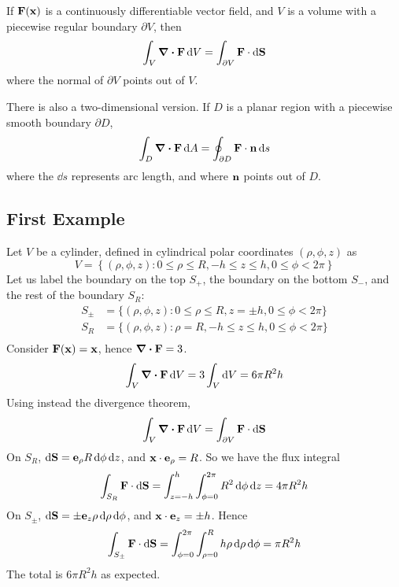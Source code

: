 \begin{proposition}
	If \(\vb F(\vb x)\) is a continuously differentiable vector field, and \(V\) is a volume with a piecewise regular boundary \(\partial V\), then
	\[ \int_V \div{\vb F} \dd{V} = \int_{\partial V} \vb F \cdot \dd{\vb S} \]
	where the normal of \(\partial V\) points out of \(V\).
\end{proposition}
\noindent There is also a two-dimensional version. If \(D\) is a planar region with a piecewise smooth boundary \(\partial D\),
\[ \int_D \div{\vb F} \dd{A} = \oint_{\partial D} \vb F \cdot \vb n \dd{s} \]
where the \(\dd{s}\) represents arc length, and where \(\vb n\) points out of \(D\).

\subsection{First Example}
Let \(V\) be a cylinder, defined in cylindrical polar coordinates \((\rho, \phi, z)\) as
\[ V = \left\{ (\rho, \phi, z) \colon 0 \leq \rho \leq R, -h \leq z \leq h, 0 \leq \phi < 2 \pi \right\} \]
Let us label the boundary on the top \(S_+\), the boundary on the bottom \(S_-\), and the rest of the boundary \(S_R\):
\begin{align*}
	S_\pm & = \{ (\rho, \phi, z) \colon 0 \leq \rho \leq R, z = \pm h, 0 \leq \phi < 2 \pi \} \\
	S_R   & = \{ (\rho, \phi, z) \colon \rho = R, -h \leq z \leq h, 0 \leq \phi < 2 \pi \}    \\
\end{align*}
Consider \(\vb F(\vb x) = \vb x\), hence \(\div{\vb F} = 3\).
\[ \int_V \div{\vb F} \dd{V} = 3 \int_V \dd{V} = 6\pi R^2 h \]
Using instead the divergence theorem,
\[ \int_V \div{\vb F} \dd{V} = \int_{\partial V} \vb F \cdot \dd{\vb S} \]
On \(S_R\), \(\dd{\vb S} = \vb e_\rho R \dd{\phi}\dd{z}\), and \(\vb x \cdot \vb e_\rho = R\). So we have the flux integral
\[ \int_{S_R} \vb F \cdot \dd{\vb S} = \int_{z = -h}^h \int_{\phi = 0}^{2 \pi} R^2 \dd{\phi} \dd{z} = 4\pi R^2 h \]
On \(S_\pm\), \(\dd{\vb S} = \pm \vb e_z \rho \dd{\rho}\dd{\phi}\), and \(\vb x \cdot \vb e_z = \pm h\). Hence
\[ \int_{S_\pm} \vb F \cdot \dd{\vb S} = \int_{\phi = 0}^{2 \pi} \int_{\rho = 0}^R h \rho\dd{\rho}\dd{\phi} = \pi R^2 h \]
The total is \(6\pi R^2 h\) as expected.

